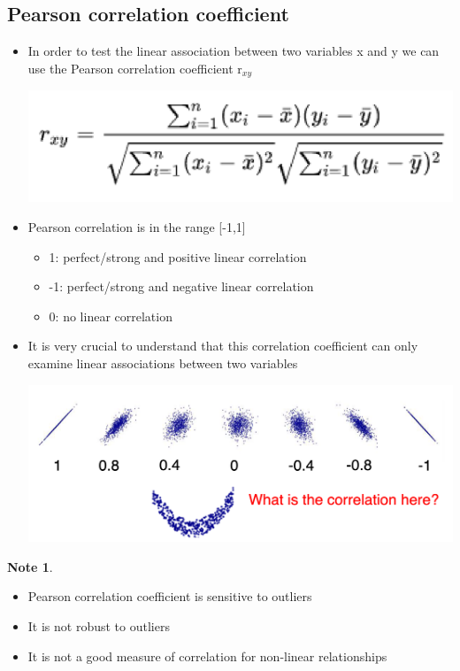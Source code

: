 \documentclass[11pt]{article}
\theoremstyle{definition}
\newtheorem{note}{Note}
\begin{document}
\subsection{Pearson correlation coefficient}
\begin{itemize}
  \item In order to test the linear association
  between two variables x and y we can use
  the Pearson correlation coefficient r$_{xy}$

  \includegraphics[width=\textwidth/2]{3.png}
  \item Pearson correlation is in the range [-1,1]
  \begin{itemize}
    \item 1: perfect/strong and positive linear correlation
    \item -1: perfect/strong and negative linear correlation
    \item 0: no linear correlation
  \end{itemize}
  \item It is very crucial to understand that this
  correlation coefficient can only examine
  linear associations between two variables

  \includegraphics[width=\textwidth/2]{4.png}
\end{itemize}
\begin{note}
  \begin{itemize}
    \item Pearson correlation coefficient is sensitive to
    outliers
    \item It is not robust to outliers
    \item It is not a good measure of correlation for
    non-linear relationships
  \end{itemize}
\end{note}
\end{document}
